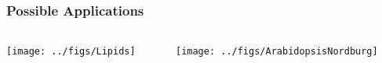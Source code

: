 \documentclass{beamer}
\begin{document}

\begin{frame}
	\frametitle{Possible Applications}
	\begin{columns}
		\begin{column}{0.45\textwidth}
			\texttt{[image: ../figs/Lipids]}
		\end{column}
		\begin{column}{0.55\textwidth}
			\texttt{[image: ../figs/ArabidopsisNordburg]}
		\end{column}
	\end{columns}
\end{frame}
\end{document}
